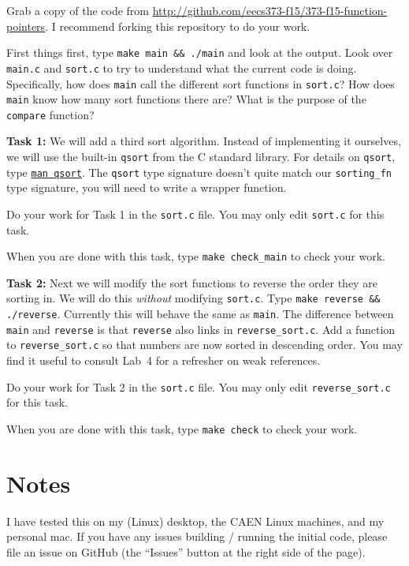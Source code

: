 \documentclass{article}
\begin{document}
Grab a copy of the code from
\url{http://github.com/eecs373-f15/373-f15-function-pointers}.
I recommend forking this repository to do your work.

\medskip
\noindent
First things first, type \texttt{make main \&\& ./main} and look at the output.
Look over \texttt{main.c} and \texttt{sort.c} to try to understand what the
current code is doing. Specifically, how does \texttt{main} call the different
sort functions in \texttt{sort.c}? How does \texttt{main} know how many sort
functions there are? What is the purpose of the \texttt{compare} function?

\bigskip
\noindent
\textbf{Task 1:} We will add a third sort algorithm. Instead of implementing
it ourselves, we will use the built-in \texttt{qsort} from the C standard
library. For details on \texttt{qsort}, type
\texttt{\href{http://linux.die.net/man/3/qsort}{man qsort}}. The
\texttt{qsort} type signature doesn't quite match our \texttt{sorting\_fn}
type signature, you will need to write a wrapper function.

\smallskip
\noindent
Do your work for Task 1 in the \texttt{sort.c} file. You may only edit
\texttt{sort.c} for this task.

\smallskip
\noindent
When you are done with this task, type \texttt{make check\_main} to check your work.

\bigskip
\noindent
\textbf{Task 2:} Next we will modify the sort functions to reverse the order
they are sorting in. We will do this \emph{without} modifying \texttt{sort.c}.
Type \texttt{make reverse \&\& ./reverse}. Currently this will behave the same
as \texttt{main}. The difference between \texttt{main} and \texttt{reverse} is
that \texttt{reverse} also links in \texttt{reverse\_sort.c}.
Add a function to \texttt{reverse\_sort.c} so that numbers are now sorted in
descending order.
You may find it useful to consult Lab~4 for a refresher on weak references.

\smallskip
\noindent
Do your work for Task 2 in the \texttt{sort.c} file. You may only edit
\texttt{reverse\_sort.c} for this task.

\smallskip
\noindent
When you are done with this task, type \texttt{make check} to check your work.

\section*{Notes}
I have tested this on my (Linux) desktop, the CAEN Linux machines, and my
personal mac. If you have any issues building / running the initial code,
please file an issue on GitHub (the ``Issues'' button at the right side of the
page).
\end{document}
